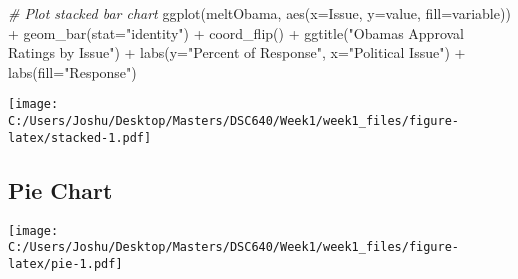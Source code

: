 \documentclass[
]{article}
\newenvironment{Shaded}{\begin{snugshade}}{\end{snugshade}}
\newcommand{\AttributeTok}[1]{\textcolor[rgb]{0.77,0.63,0.00}{#1}}
\newcommand{\CommentTok}[1]{\textcolor[rgb]{0.56,0.35,0.01}{\textit{#1}}}
\newcommand{\FunctionTok}[1]{\textcolor[rgb]{0.00,0.00,0.00}{#1}}
\newcommand{\NormalTok}[1]{#1}
\newcommand{\OtherTok}[1]{\textcolor[rgb]{0.56,0.35,0.01}{#1}}
\newcommand{\SpecialCharTok}[1]{\textcolor[rgb]{0.00,0.00,0.00}{#1}}
\newcommand{\StringTok}[1]{\textcolor[rgb]{0.31,0.60,0.02}{#1}}
\begin{document}
\begin{Shaded}
\begin{Highlighting}[]
\CommentTok{\# Plot stacked bar chart}
\FunctionTok{ggplot}\NormalTok{(meltObama, }\FunctionTok{aes}\NormalTok{(}\AttributeTok{x=}\NormalTok{Issue, }\AttributeTok{y=}\NormalTok{value, }\AttributeTok{fill=}\NormalTok{variable)) }\SpecialCharTok{+} 
  \FunctionTok{geom\_bar}\NormalTok{(}\AttributeTok{stat=}\StringTok{"identity"}\NormalTok{) }\SpecialCharTok{+} \FunctionTok{coord\_flip}\NormalTok{() }\SpecialCharTok{+} 
  \FunctionTok{ggtitle}\NormalTok{(}\StringTok{"Obama\textquotesingle{}s Approval Ratings by Issue"}\NormalTok{) }\SpecialCharTok{+} 
  \FunctionTok{labs}\NormalTok{(}\AttributeTok{y=}\StringTok{"Percent of Response"}\NormalTok{, }\AttributeTok{x=}\StringTok{"Political Issue"}\NormalTok{) }\SpecialCharTok{+} 
  \FunctionTok{labs}\NormalTok{(}\AttributeTok{fill=}\StringTok{"Response"}\NormalTok{)}
\end{Highlighting}
\end{Shaded}

\texttt{[image: C:/Users/Joshu/Desktop/Masters/DSC640/Week1/week1\_files/figure-latex/stacked-1.pdf]}
\pagebreak

\hypertarget{pie-chart}{%
\subsection{Pie Chart}\label{pie-chart}}

\begin{Shaded}
\end{Shaded}

\texttt{[image: C:/Users/Joshu/Desktop/Masters/DSC640/Week1/week1\_files/figure-latex/pie-1.pdf]}
\pagebreak
\end{document}
